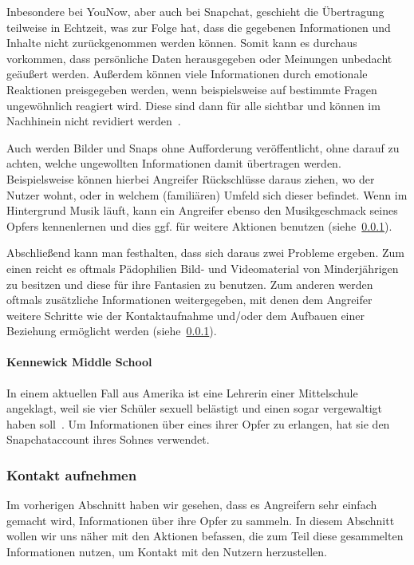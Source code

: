 Inbesondere bei YouNow, aber auch bei Snapchat, geschieht die \"Ubertragung
teilweise in Echtzeit, was zur Folge hat, dass die gegebenen Informationen und
Inhalte nicht zur\"uckgenommen werden k\"onnen. Somit kann es durchaus
vorkommen, dass pers\"onliche Daten herausgegeben oder Meinungen unbedacht
ge\"au{\ss}ert werden. Au{\ss}erdem k\"onnen viele Informationen durch
emotionale Reaktionen preisgegeben werden, wenn beispielsweise auf bestimmte
Fragen ungew\"ohnlich reagiert wird. Diese sind dann f\"ur alle sichtbar und
k\"onnen im Nachhinein nicht revidiert werden~\cite{KS15}.

Auch werden Bilder und Snaps ohne Aufforderung ver\"offentlicht, ohne darauf zu
achten, welche ungewollten Informationen damit \"ubertragen werden.
Beispielsweise k\"onnen hierbei Angreifer R\"uckschl\"usse daraus ziehen, wo
der Nutzer wohnt, oder in welchem (famili\"aren) Umfeld sich dieser befindet.
Wenn im Hintergrund Musik l\"auft, kann ein Angreifer ebenso den Musikgeschmack
seines Opfers kennenlernen und dies ggf. f\"ur weitere Aktionen benutzen
(siehe~\ref{gefahren:kinder:treffen}).

Abschlie{\ss}end kann man festhalten, dass sich daraus zwei Probleme ergeben.
Zum einen reicht es oftmals P\"adophilien Bild- und Videomaterial von
Minderj\"ahrigen zu besitzen und diese f\"ur ihre Fantasien zu benutzen. Zum
anderen werden oftmals zus\"atzliche Informationen weitergegeben, mit denen dem
Angreifer weitere Schritte wie der Kontaktaufnahme und/oder dem Aufbauen einer
Beziehung erm\"oglicht werden (siehe~\ref{gefahren:kinder:treffen}).

\paragraph{Kennewick Middle School} In einem aktuellen Fall aus Amerika ist
eine Lehrerin einer Mittelschule angeklagt, weil sie vier Sch\"uler sexuell
bel\"astigt und einen sogar vergewaltigt haben soll~\cite{tri-middle}. Um
Informationen \"uber eines ihrer Opfer zu erlangen, hat sie den Snapchataccount
ihres Sohnes verwendet.

\subsubsection{Kontakt aufnehmen}
\label{gefahren:kinder:treffen}
Im vorherigen Abschnitt haben wir gesehen, dass es Angreifern sehr einfach
gemacht wird, Informationen \"uber ihre Opfer zu sammeln. In diesem Abschnitt
wollen wir uns n\"aher mit den Aktionen befassen, die zum Teil diese
gesammelten Informationen nutzen, um Kontakt mit den Nutzern herzustellen.

